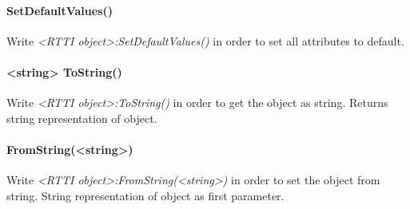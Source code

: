 \paragraph{SetDefaultValues()}
Write \emph{<RTTI object>:SetDefaultValues()} in order to set all attributes to default.

\paragraph{<string> ToString()}
Write \emph{<RTTI object>:ToString()} in order to get the object as string. Returns string representation of object.

\paragraph{FromString(<string>)}
Write \emph{<RTTI object>:FromString(<string>)} in order to set the object from string. String representation of object as first parameter.
